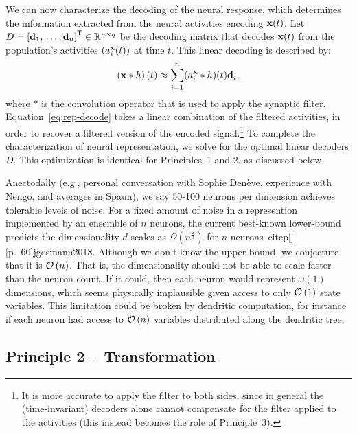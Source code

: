 We can now characterize the decoding of the neural response, which determines the information extracted from the neural activities encoding $\mathbf{x}(t)$.
Let $D = {\left[ \mathbf{d}_1\text{,}\, \ldots\text{,}\, \mathbf{d}_n \right]}^\mathsf{T} \in \mathbb{R}^{n \times q}$ be the decoding matrix that decodes $\mathbf{x}(t)$ from the population's activities $\left( a_i^{\mathbf{x}}(t) \right)$ at time $t$.
This linear decoding is described by:
\begin{equation} \label{eq:rep-decode}
\left(\mathbf{x} \ast h \right)(t) \approx \sum_{i=1}^n (a_i^{\mathbf{x}} \ast h)(t) \mathbf{d}_i \text{,}
\end{equation}
where $\ast$ is the convolution operator that is used to apply the synaptic filter.
Equation~\ref{eq:rep-decode} takes a linear combination of the filtered activities, in order to recover a filtered version of the encoded signal.\footnote{It is more accurate to apply the filter to both sides, since in general the (time-invariant) decoders alone cannot compensate for the filter applied to the activities (this instead becomes the role of Principle~3).}
To complete the characterization of neural representation, we solve for the optimal linear decoders $D$.
This optimization is identical for Principles~1 and 2, as discussed below.


Anectodally (e.g., personal conversation with Sophie Den\`eve, experience with Nengo, and averages in Spaun), we say 50-100 neurons per dimension achieves tolerable levels of noise.
For a fixed amount of noise in a represention implemented by an ensemble of $n$ neurons, the current best-known lower-bound predicts the dimensionality $d$ scales as $\Omega \left( n^{\frac{2}{3}} \right)$ for $n$ neurons~citep[][p.~60]{jgosmann2018}.
Although we don't know the upper-bound, we conjecture that it is $\mathcal{O}\left({n}\right)$.
That is, the dimensionality should not be able to scale faster than the neuron count.
If it could, then each neuron would represent $\omega(1)$ dimensions, which seems physically implausible given access to only $\mathcal{O}\left({1}\right)$ state variables.
This limitation could be broken by dendritic computation, for instance if each neuron had access to $\mathcal{O}\left({n}\right)$ variables distributed along the dendritic tree.

\subsection{Principle 2 -- Transformation}
\label{sec:principle2}

